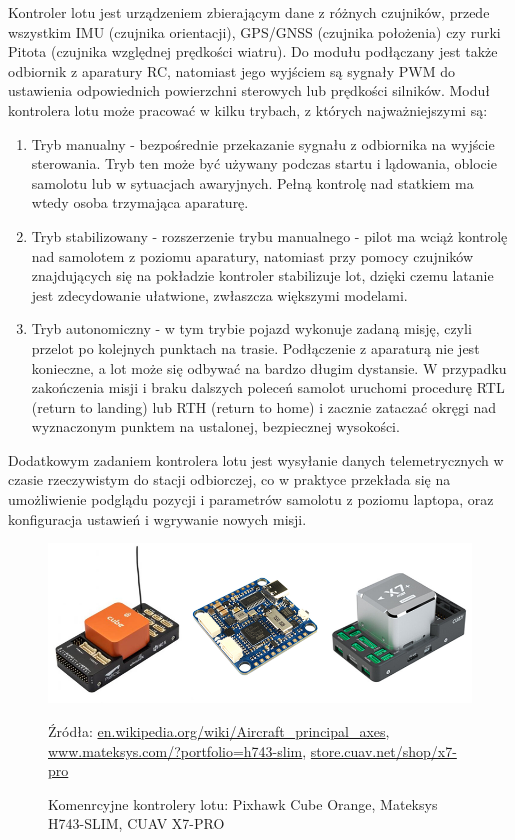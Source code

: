 \documentclass[12pt, a4paper]{article}
\begin{document}
Kontroler lotu jest urządzeniem zbierającym dane z różnych czujników, przede wszystkim IMU (czujnika orientacji), GPS/GNSS (czujnika położenia) czy rurki Pitota (czujnika względnej prędkości wiatru). Do modułu podłączany jest także odbiornik z aparatury RC, natomiast jego wyjściem są sygnały PWM do ustawienia odpowiednich powierzchni sterowych lub prędkości silników. 
Moduł kontrolera lotu może pracować w kilku trybach, z których najważniejszymi są:
\begin{enumerate}


	\item Tryb manualny - bezpośrednie przekazanie sygnału z odbiornika na wyjście sterowania. Tryb ten może być używany podczas startu i lądowania, oblocie samolotu lub w sytuacjach awaryjnych. Pełną kontrolę nad statkiem ma wtedy osoba trzymająca aparaturę.
	\item Tryb stabilizowany - rozszerzenie trybu manualnego - pilot ma wciąż kontrolę nad samolotem z poziomu aparatury, natomiast przy pomocy czujników znajdujących się na pokładzie kontroler stabilizuje lot, dzięki czemu latanie jest zdecydowanie ułatwione, zwłaszcza większymi modelami.
	\item Tryb autonomiczny - w tym trybie pojazd wykonuje zadaną misję, czyli przelot po kolejnych punktach na trasie. Podłączenie z aparaturą nie jest konieczne, a lot może się odbywać na bardzo długim dystansie. W przypadku zakończenia misji i braku dalszych poleceń samolot uruchomi procedurę RTL (return to landing) lub RTH (return to home) i zacznie zataczać okręgi nad wyznaczonym punktem na ustalonej, bezpiecznej wysokości.

\end{enumerate}
	
Dodatkowym zadaniem kontrolera lotu jest wysyłanie danych telemetrycznych w czasie rzeczywistym do stacji odbiorczej, co w praktyce przekłada się na umożliwienie podglądu pozycji i parametrów samolotu z poziomu laptopa, oraz konfiguracja ustawień i wgrywanie nowych misji.

 \begin{figure}[ht]
    \centering
    \includegraphics[width=1\textwidth]{kontrolery}
    \caption{Komenrcyjne kontrolery lotu: Pixhawk Cube Orange, Mateksys H743-SLIM, CUAV X7-PRO}
    \small Źródła: \url{en.wikipedia.org/wiki/Aircraft_principal_axes}, \url{www.mateksys.com/?portfolio=h743-slim}, \url{store.cuav.net/shop/x7-pro}
    \label{fig:kontrolery}
\end{figure}
\end{document}
